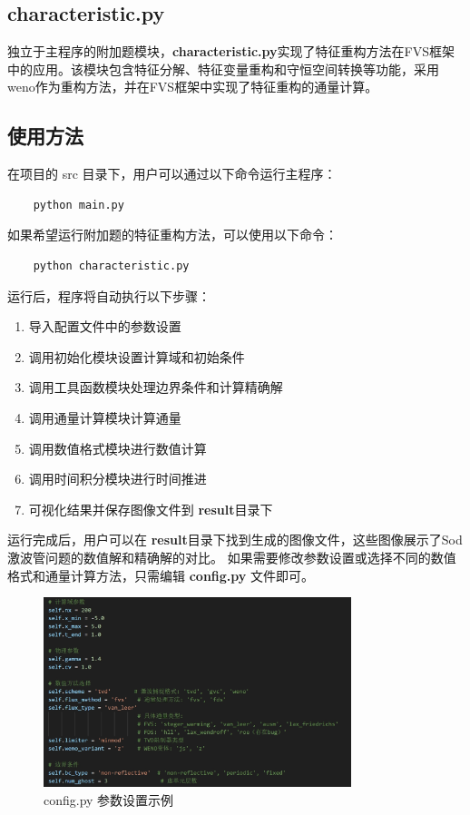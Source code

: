 \documentclass[UTF8]{ctexart}
\begin{document}
\subsection{characteristic.py}
独立于主程序的附加题模块，\textbf{characteristic.py}实现了特征重构方法在FVS框架中的应用。该模块包含特征分解、特征变量重构和守恒空间转换等功能，采用weno作为重构方法，并在FVS框架中实现了特征重构的通量计算。

\subsection{使用方法}
在项目的 src 目录下，用户可以通过以下命令运行主程序：
\begin{verbatim}
    python main.py
\end{verbatim}
如果希望运行附加题的特征重构方法，可以使用以下命令：
\begin{verbatim}
    python characteristic.py
\end{verbatim}
运行后，程序将自动执行以下步骤：
\begin{enumerate}           
    \item 导入配置文件中的参数设置
    \item 调用初始化模块设置计算域和初始条件
    \item 调用工具函数模块处理边界条件和计算精确解
    \item 调用通量计算模块计算通量
    \item 调用数值格式模块进行数值计算
    \item 调用时间积分模块进行时间推进
    \item 可视化结果并保存图像文件到 \textbf{result}目录下
\end{enumerate}
运行完成后，用户可以在 \textbf{result}目录下找到生成的图像文件，这些图像展示了Sod激波管问题的数值解和精确解的对比。
如果需要修改参数设置或选择不同的数值格式和通量计算方法，只需编辑 \textbf{config.py} 文件即可。
\begin{figure}
    \centering
    \includegraphics[width=0.8\textwidth]{config_example.png}
    \caption{config.py 参数设置示例}
    \label{fig:config_example}
\end{figure}
\end{document}
